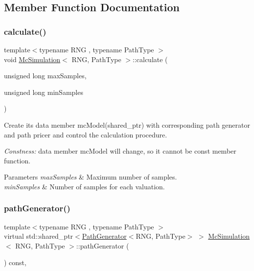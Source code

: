 \subsection{Member Function Documentation}
\hypertarget{class_mc_simulation_a9d323dca5d0a6c50d6fbab6ea564a1f3}{}\label{class_mc_simulation_a9d323dca5d0a6c50d6fbab6ea564a1f3} 
\subsubsection{\texorpdfstring{calculate()}{calculate()}}
{\footnotesize\ttfamily template$<$typename R\+NG , typename Path\+Type $>$ \\
void \hyperlink{class_mc_simulation}{Mc\+Simulation}$<$ R\+NG, Path\+Type $>$\+::calculate (\begin{DoxyParamCaption}\item[{unsigned long}]{max\+Samples,  }\item[{unsigned long}]{min\+Samples }\end{DoxyParamCaption})}



Create its data member mc\+Model(shared\+\_\+ptr) with corresponding path generator and path pricer and control the calculation procedure. 

{\itshape Constness\+:} data member mc\+Model will change, so it cannot be const member function. 
\begin{DoxyParams}{Parameters}
{\em max\+Samples} & Maximum number of samples. \\
\hline
{\em min\+Samples} & Number of samples for each valuation. \\
\hline
\end{DoxyParams}
\hypertarget{class_mc_simulation_afa7ba8d9b534837e7c62f47c6d20a353}{}\label{class_mc_simulation_afa7ba8d9b534837e7c62f47c6d20a353} 
\subsubsection{\texorpdfstring{path\+Generator()}{pathGenerator()}}
{\footnotesize\ttfamily template$<$typename R\+NG , typename Path\+Type $>$ \\
virtual std\+::shared\+\_\+ptr$<$\hyperlink{class_path_generator}{Path\+Generator}$<$R\+NG, Path\+Type$>$ $>$ \hyperlink{class_mc_simulation}{Mc\+Simulation}$<$ R\+NG, Path\+Type $>$\+::path\+Generator (\begin{DoxyParamCaption}{ }\end{DoxyParamCaption}) const\hspace{0.3cm}{\ttfamily [private]}, {}}



